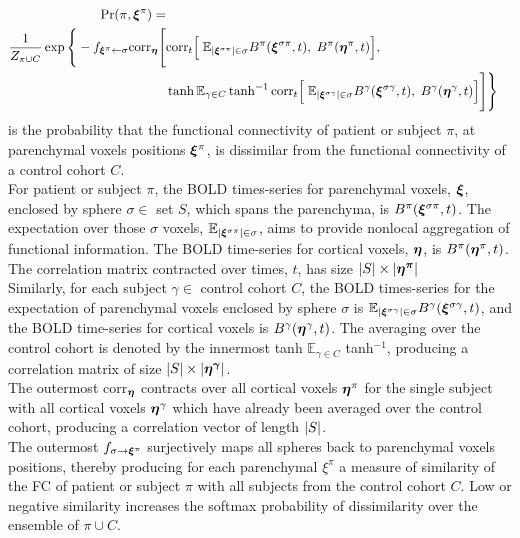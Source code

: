 \documentclass[10pt]{article}
\begin{document}
\begin{equation*}
\begin{split}
  \text{Pr}\qty(\pi, \vb*{\xi}^{\pi}) = \\
  \frac{1}{Z_{\pi \cup C}} \exp\Bigg\{-f_{\vb*{\xi}^\pi \leftarrow \sigma}
  \text{corr}_{\vb*{\eta}} \Bigg[ &
            \text{corr}_t\qty\Big[ \;
                       \mathbb{E}_{\qty|\vb*{\xi}^{\sigma\pi}| \in \sigma} B^{\pi}(\vb*{\xi}^{\sigma\pi}, t), \; 
                       B^{\pi}(\vb*{\eta}^{\pi}, t) ], \; \\
          & \hyptangent
            \mathbb{E}_{\gamma \in C}
            \hyptangent^{-1}
            \text{corr}_t\qty\Big[ \; 
                       \mathbb{E}_{\qty|\vb*{\xi}^{\sigma\gamma}| \in \sigma} B^\gamma(\vb*{\xi}^{\sigma\gamma}, t), \;
                       B^\gamma(\vb*{\eta}^\gamma, t) ]
            \Bigg] \Bigg\}
\end{split}            
\end{equation*}
is the probability that the functional connectivity of patient or subject $\pi$, at parenchymal voxels positions $\vb*{\xi}^{\pi}$, is dissimilar from the functional connectivity of a control cohort $C$. \\

For patient or subject $\pi$, the BOLD times-series for parenchymal voxels, $\vb*{\xi}$, enclosed by sphere $\sigma \in$ set $S$, which spans the parenchyma, is $B^\pi\qty(\vb*{\xi}^{\sigma\pi}, t)$.  The expectation over those $\sigma$ voxels, $\mathbb{E}_{\qty|\vb*{\xi}^{\sigma\pi}| \in \sigma}$, aims to provide nonlocal aggregation of functional information.  The BOLD time-series for cortical voxels, $\vb*{\eta}$, is $B^\pi\qty(\vb*{\eta}^\pi, t)$.  The correlation matrix contracted over times, $t$, has size $\qty|S| \times \qty|\vb*{\eta^\pi}|$\\

Similarly, for each subject $\gamma \in$ control cohort $C$, the BOLD times-series for the expectation of parenchymal voxels enclosed by sphere $\sigma$ is $\mathbb{E}_{\qty|\vb*{\xi}^{\sigma\gamma}| \in \sigma} B^\gamma\qty(\vb*{\xi}^{\sigma\gamma}, t)$, and the BOLD time-series for cortical voxels is $B^\gamma\qty(\vb*{\eta}^\gamma, t)$.  The averaging over the control cohort is denoted by the innermost tanh $\mathbb{E}_{\gamma \in C}$ tanh$^{-1}$, producing a correlation matrix of size $\qty|S| \times \qty|\vb*{\eta^\gamma}|$.  \\

The outermost corr$_{\vb*{\eta}}$ contracts over all cortical voxels $\vb*{\eta}^\pi$ for the single subject with all cortical voxels $\vb*{\eta}^\gamma$ which have already been averaged over the control cohort, producing a correlation vector of length $\qty|S|$.  \\

The outermost $f_{\sigma \rightarrow \vb*{\xi}^\pi}$ surjectively maps all spheres back to parenchymal voxels positions, thereby producing for each parenchymal $\xi^\pi$ a measure of similarity of the FC of patient or subject $\pi$ with all subjects from the control cohort $C$.  Low or negative similarity increases the softmax probability of dissimilarity over the ensemble of $\pi \cup C$.
\end{document}
